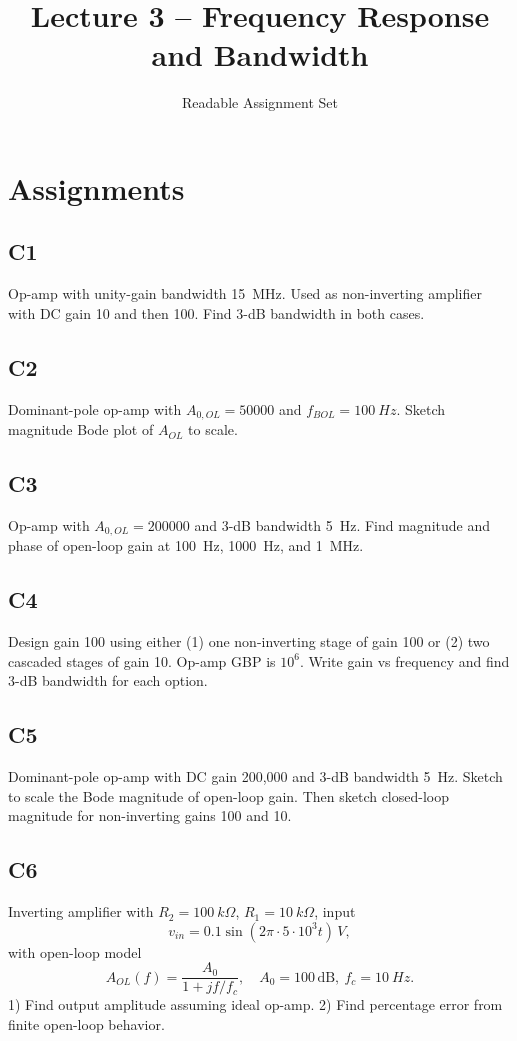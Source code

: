 \documentclass[12pt,a4paper]{article}
\title{Lecture 3 -- Frequency Response and Bandwidth}
\author{Readable Assignment Set}
\date{}
\begin{document}
\maketitle
\tableofcontents

\section{Assignments}
\subsection{C1}
Op-amp with unity-gain bandwidth \SI{15}{MHz}. Used as non-inverting amplifier with DC gain 10 and then 100. Find 3-dB bandwidth in both cases.

\subsection{C2}
Dominant-pole op-amp with $A_{0,OL}=\num{50000}$ and $f_{BOL}=\SI{100}{Hz}$. Sketch magnitude Bode plot of $A_{OL}$ to scale.

\subsection{C3}
Op-amp with $A_{0,OL}=\num{200000}$ and 3-dB bandwidth \SI{5}{Hz}. Find magnitude and phase of open-loop gain at \SI{100}{Hz}, \SI{1000}{Hz}, and \SI{1}{MHz}.

\subsection{C4}
Design gain 100 using either (1) one non-inverting stage of gain 100 or (2) two cascaded stages of gain 10. Op-amp GBP is $10^6$. Write gain vs frequency and find 3-dB bandwidth for each option.

\subsection{C5}
Dominant-pole op-amp with DC gain 200,000 and 3-dB bandwidth \SI{5}{Hz}. Sketch to scale the Bode magnitude of open-loop gain. Then sketch closed-loop magnitude for non-inverting gains 100 and 10.

\subsection{C6}
Inverting amplifier with $R_2=\SI{100}{k\Omega}$, $R_1=\SI{10}{k\Omega}$, input 
\[
v_{in}=0.1\sin(2\pi\cdot 5\cdot10^3 t)\,\si{V},
\]
with open-loop model
\[
A_{OL}(f)=\frac{A_0}{1+jf/f_c},\quad A_0=100\,\text{dB},\ f_c=\SI{10}{Hz}.
\]
1) Find output amplitude assuming ideal op-amp.
2) Find percentage error from finite open-loop behavior.
\end{document}
